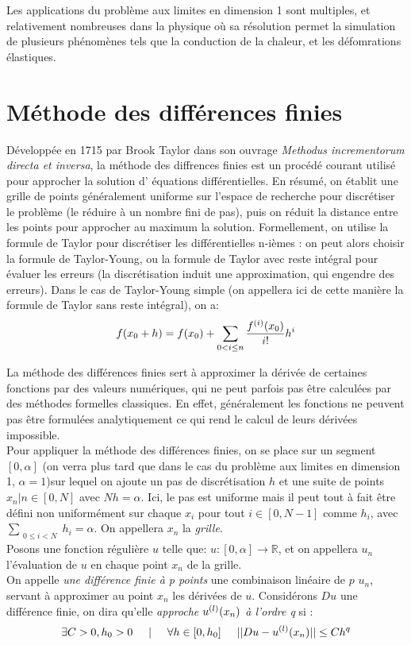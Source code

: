 \documentclass[12pt]{article}
\newcommand{\R}{\mathbb R}
\begin{document}
Les applications du problème aux limites en dimension 1 sont multiples, et relativement nombreuses dans la physique où sa résolution permet la simulation de plusieurs phénomènes tels que la conduction de la chaleur, et les défomrations élastiques.



\section{Méthode des différences finies}

\quad Développée en 1715 par Brook Taylor dans son ouvrage \emph{Methodus incrementorum directa et inversa}, la méthode des diffrences finies est un procédé courant utilisé pour approcher la solution d' équations différentielles. En résumé, on établit une grille de points généralement uniforme sur l'espace de recherche pour discrétiser le problème (le réduire à un nombre fini de pas), puis on réduit la distance entre les points pour approcher au maximum la solution.
\quad Formellement, on utilise la formule de Taylor pour discrétiser les différentielles n-ièmes : on peut alors choisir la formule de Taylor-Young, ou la formule de Taylor avec reste intégral pour évaluer les erreurs (la discrétisation induit une approximation, qui engendre des erreurs).
Dans le cas de Taylor-Young simple (on appellera ici de cette manière la formule de Taylor sans reste intégral), on a:
$$
f\relax(x_0 + h) = f\relax(x_0) + \sum_{\substack{0<i\le n}}\frac{f^{(i)}\relax(x_0)}{i!}h^i
$$ 

\quad La méthode des différences finies sert à approximer la dérivée de certaines fonctions par des valeurs numériques, qui ne peut parfois pas être calculées par des méthodes formelles classiques. En effet, généralement les fonctions ne peuvent pas être formulées analytiquement ce qui rend le calcul de leurs dérivées impossible.
\\
\quad Pour appliquer la méthode des différences finies, on se place sur un segment $[0, \alpha]$ (on verra plus tard que dans le cas du problème aux limites en dimension 1, $\alpha = 1$)sur lequel on ajoute un pas de discrétisation $h$ et une suite de points $x_n | n\in [0, N]$ avec $Nh = \alpha$. Ici, le pas est uniforme mais il peut tout à fait être défini non uniformément sur chaque $x_i$ pour tout $i \in [0, N-1]$ comme $h_i$, avec $\sum_{\substack{0 \le i< N}}h_i = \alpha$. On appellera $x_n$ la \emph{grille}.
\\
\quad Posons une fonction régulière $u$ telle que: $u : [0, \alpha] \longrightarrow \R$, et on appellera $u_n$ l'évaluation de $u$ en chaque point $x_n$ de la grille. \\
On appelle \emph{une différence finie à p points} une combinaison linéaire de $p$ $u_n$, servant à approximer au point $x_n$ les dérivées de $u$. Considérons $Du$ une différence finie, on dira qu'elle \emph{approche $u^{(l)}\relax(x_n)$ à l'ordre q} si :
\begin{equation}
\exists C>0, h_0 >0 \hspace{5mm}|\hspace{5mm} \forall h \in [0, h_0] \hspace{5mm} ||Du - u^{(l)}\relax(x_n)|| \le Ch^q
\end{equation}
\end{document}
